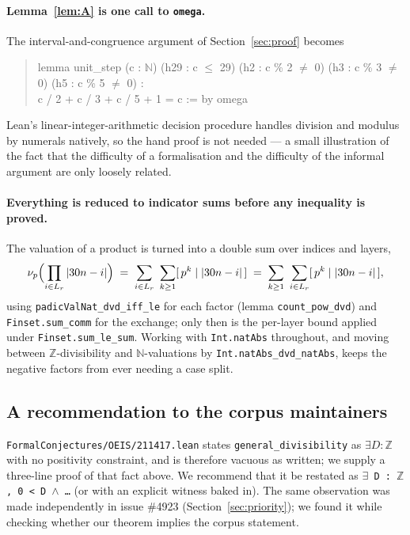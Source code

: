 \documentclass[11pt]{article}
\theoremstyle{plain}
\theoremstyle{definition}
\theoremstyle{remark}
\numberwithin{equation}{section}
\newcommand{\N}{\mathbb{N}}
\newcommand{\Z}{\mathbb{Z}}
\newcommand{\Lr}{L_r}
\begin{document}
\paragraph{Lemma~\ref{lem:A} is one call to \texttt{omega}.} The interval-and-congruence argument
of Section~\ref{sec:proof} becomes
\begin{quote}\ttfamily\small
lemma unit\_step (c : $\N$) (h29 : c $\le$ 29) (h2 : c \% 2 $\ne$ 0) (h3 : c \% 3 $\ne$ 0) (h5 : c \% 5 $\ne$ 0) :\\
\hspace*{2em}c / 2 + c / 3 + c / 5 + 1 = c := by omega
\end{quote}
Lean's linear-integer-arithmetic decision procedure handles division and modulus by numerals
natively, so the hand proof is not needed --- a small illustration of the fact that the difficulty
of a formalisation and the difficulty of the informal argument are only loosely related.

\paragraph{Everything is reduced to indicator sums before any inequality is proved.} The
valuation of a product is turned into a double sum over indices and layers,
\[
  \nu_p\Bigl(\prod_{i \in \Lr}|30n-i|\Bigr)
  \;=\; \sum_{i \in \Lr}\ \sum_{k \ge 1} [\,p^k \mid |30n-i|\,]
  \;=\; \sum_{k \ge 1}\ \sum_{i \in \Lr} [\,p^k \mid |30n-i|\,],
\]
using \texttt{padicValNat\_dvd\_iff\_le} for each factor (lemma \texttt{count\_pow\_dvd}) and
\texttt{Finset.sum\_comm} for the exchange; only then is the per-layer bound applied under
\texttt{Finset.sum\_le\_sum}. Working with \texttt{Int.natAbs} throughout, and moving between
$\Z$-divisibility and $\N$-valuations by \texttt{Int.natAbs\_dvd\_natAbs}, keeps the negative
factors from ever needing a case split.

\subsection{A recommendation to the corpus maintainers}
\label{sec:upstream}

\texttt{FormalConjectures/OEIS/211417.lean} states \texttt{general\_divisibility} as
$\exists D : \Z$ with no positivity constraint, and is therefore vacuous as written; we supply a
three-line proof of that fact above. We recommend that it be restated as
\texttt{$\exists$ D : $\Z$, 0 < D $\wedge$ \dots} (or with an explicit witness baked in). The same
observation was made independently in issue \#4923 (Section~\ref{sec:priority}); we found it
while checking whether our theorem implies the corpus statement.
\end{document}

